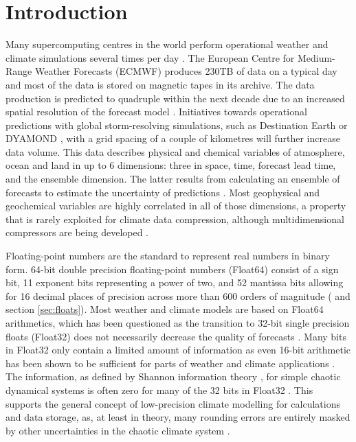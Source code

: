\section{Introduction}
\label{sec:compression_introduction}

Many supercomputing centres in the world perform operational weather and climate simulations several times per day \citep{Bauer2015}.
The European Centre for Medium-Range Weather Forecasts (ECMWF) produces 230TB of data on a typical day and
most of the data is stored on magnetic tapes in its archive. The data production is predicted to quadruple within the
next decade due to an increased spatial resolution of the forecast model \citep{Bauer2020,Voosen2020,Schar2020}.
Initiatives towards operational predictions with global storm-resolving simulations, such as Destination Earth
\citep{Bauer2021,Bauer2021a} or DYAMOND \citep{Stevens2019}, with a grid spacing of a couple of
kilometres will further increase data volume. This data describes physical and chemical variables of atmosphere, ocean
and land in up to 6 dimensions: three in space, time, forecast lead time, and the ensemble dimension. The latter results
from calculating an ensemble of forecasts to estimate the uncertainty of predictions \citep{Molteni1996,Palmer2019}.
Most geophysical and geochemical variables are highly correlated in all of those dimensions, a property that is rarely
exploited for climate data compression, although multidimensional compressors are being developed
\citep{Ballester-Ripoll2020,Lindstrom2014,vonLarcher2019,Zhao2020,Di2016}.

Floating-point numbers are the standard to represent real numbers in binary form. 64-bit double precision floating-point
numbers (Float64) consist of a sign bit, 11 exponent bits representing a power of two, and 52 mantissa bits allowing for
16 decimal places of precision across more than 600 orders of magnitude (\cite{IEEE1985} and section \ref{sec:floats}).
Most weather and climate models are based on Float64 arithmetics, which has been questioned as the transition to 32-bit single
precision floats (Float32) does not necessarily decrease the quality of forecasts \citep{Vana2017,TintoPrims2019}. Many bits in Float32
only contain a limited amount of information as even 16-bit arithmetic has been shown to be sufficient for parts of weather
and climate applications \citep{Hatfield2019,Klower2020a,Ackmann2021,Dawson2018,Fan2019}.
The information, as defined by Shannon information theory \citep{Shannon1948,MacKay2003,Kleeman2011},
for simple chaotic dynamical systems is often zero for many of the 32 bits in Float32 \citep{Jeffress2017}.
This supports the general concept of low-precision climate modelling for calculations and data storage, as, at least in theory,
many rounding errors are entirely masked by other uncertainties in the chaotic climate system
\citep{Palmer2014a,Palmer2015}.


